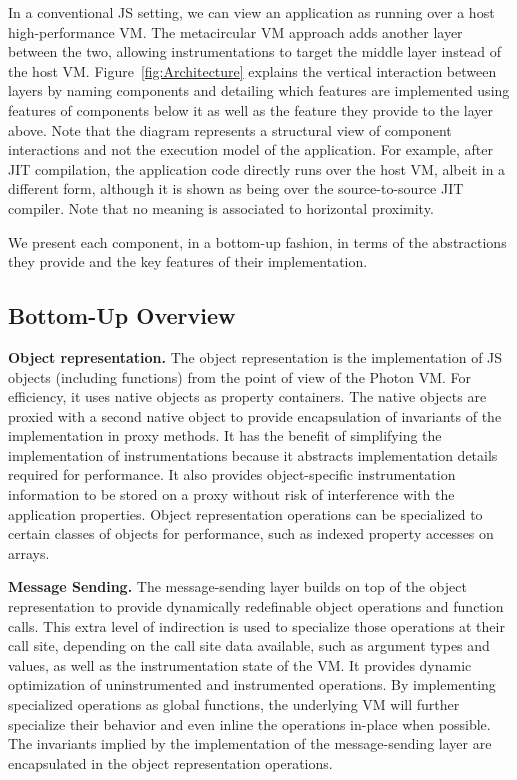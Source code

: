 In a conventional JS setting, we can view an application as running over a host
high-performance VM. The metacircular VM approach adds another layer between
the two, allowing instrumentations to target the middle layer instead of the
host VM.  Figure~\ref{fig:Architecture} explains the vertical interaction
between layers by naming components and detailing which features are
implemented using features of components below it as well as the feature they
provide to the layer above. Note that the diagram represents a structural view
of component interactions and not the execution model of the application. For
example, after JIT compilation, the application code directly runs over the
host VM, albeit in a different form, although it is shown as being over the
source-to-source JIT compiler.  Note that no meaning is associated to
horizontal proximity.

We present each component, in a bottom-up fashion, in terms of the abstractions
they provide and the key features of their implementation. 

\subsection{Bottom-Up Overview}

\textbf{Object representation.} The object representation is the implementation
of JS objects (including functions) from the point of view of the Photon VM.
For efficiency, it uses native objects as property containers. The native
objects are proxied with a second native object to provide encapsulation of
invariants of the implementation in proxy methods. It has the benefit of
simplifying the implementation of instrumentations because it abstracts
implementation details required for performance. It also provides object-specific
instrumentation information to be stored on a proxy without risk of
interference with the application properties.  Object representation operations
can be specialized to certain classes of objects for performance, such as
indexed property accesses on arrays.

\textbf{Message Sending.} The message-sending layer builds on top of the object
representation to provide dynamically redefinable object operations and
function calls. This extra level of indirection is used to specialize those
operations at their call site, depending on the call site data available, such
as argument types and values, as well as the instrumentation state of the VM.
It provides dynamic optimization of uninstrumented and instrumented operations.
By implementing specialized operations as global functions, the underlying VM
will further specialize their behavior and even inline the operations in-place
when possible. The invariants implied by the implementation of the
message-sending layer are encapsulated in the object representation operations.

